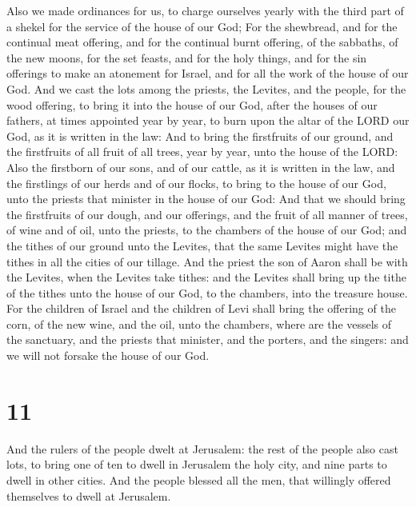  Also we made ordinances for us, to charge ourselves yearly
with the third part of a shekel for the service of the house of our God;
 For the shewbread, and for the continual meat offering,
and for the continual burnt offering, of the sabbaths, of the new moons,
for the set feasts, and for the holy things, and for the sin offerings
to make an atonement for Israel, and for all the work of the house of
our God.  And we cast the lots among the priests, the
Levites, and the people, for the wood offering, to bring it into the
house of our God, after the houses of our fathers, at times appointed
year by year, to burn upon the altar of the LORD our God, as it is
written in the law:  And to bring the firstfruits of our
ground, and the firstfruits of all fruit of all trees, year by year,
unto the house of the LORD:  Also the firstborn of our
sons, and of our cattle, as it is written in the law, and the firstlings
of our herds and of our flocks, to bring to the house of our God, unto
the priests that minister in the house of our God:  And
that we should bring the firstfruits of our dough, and our offerings,
and the fruit of all manner of trees, of wine and of oil, unto the
priests, to the chambers of the house of our God; and the tithes of our
ground unto the Levites, that the same Levites might have the tithes in
all the cities of our tillage.  And the priest the son of
Aaron shall be with the Levites, when the Levites take tithes: and the
Levites shall bring up the tithe of the tithes unto the house of our
God, to the chambers, into the treasure house.  For the
children of Israel and the children of Levi shall bring the offering of
the corn, of the new wine, and the oil, unto the chambers, where are the
vessels of the sanctuary, and the priests that minister, and the
porters, and the singers: and we will not forsake the house of our God.

\hypertarget{section-10}{%
\section{11}\label{section-10}}

 And the rulers of the people dwelt at Jerusalem: the rest
of the people also cast lots, to bring one of ten to dwell in Jerusalem
the holy city, and nine parts to dwell in other cities.  And
the people blessed all the men, that willingly offered themselves to
dwell at Jerusalem.

